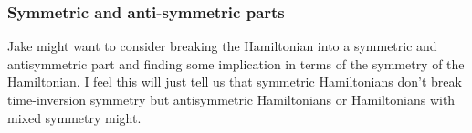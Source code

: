 \documentclass[aps,pra,12pt,nofootinbib,superscriptaddress,longbibliography,showpacs]{revtex4-1}
\theoremstyle{plain}
\theoremstyle{definition}
\begin{document}
\subsubsection{Symmetric and anti-symmetric parts}
Jake might want to consider breaking the Hamiltonian into a symmetric and antisymmetric part and finding some implication in terms of the symmetry of the Hamiltonian. I feel this will just tell us that symmetric Hamiltonians don't break time-inversion symmetry but antisymmetric Hamiltonians or Hamiltonians with mixed symmetry might.


\end{document}
